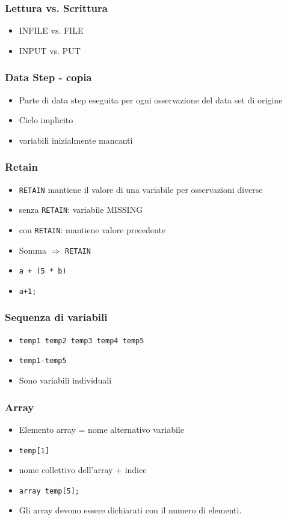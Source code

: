 \begin{frame}\frametitle{Lettura vs. Scrittura}
\begin{itemize}
\item
INFILE vs. FILE
\item
INPUT vs. PUT
\end{itemize}
\end{frame}



\begin{frame}[fragile]\frametitle{Data Step - copia }
  \begin{itemize}
  \item
    Parte di data step eseguita per ogni osservazione del data set di origine
  \item
    Ciclo implicito
  \item variabili inizialmente mancanti
  \end{itemize}
\end{frame}

\begin{frame}[fragile]\frametitle{Retain}
  \begin{itemize}
  \item
    \verb+RETAIN+ mantiene il valore di una variabile per osservazioni diverse
  \item
    senza \verb+RETAIN+: variabile MISSING
  \item
    con \verb+RETAIN+: mantiene valore precedente
  \item
    Somma $\Rightarrow$ \verb+RETAIN+
  \item
    \verb!a + (5 * b)!
  \item
    \verb!a+1;!
  \end{itemize}
\end{frame}




\begin{frame}[containsverbatim]\frametitle{Sequenza di variabili}
  \begin{itemize}
  \item
    \verb+temp1 temp2 temp3 temp4 temp5+
  \item
    \verb+temp1-temp5+
  \item
    Sono variabili individuali
  \end{itemize}\end{frame}


\begin{frame}[containsverbatim]\frametitle{Array}
  \begin{itemize}
  \item
    Elemento array = nome alternativo variabile
  \item
    \verb!temp[1]!
  \item
    nome collettivo dell'array + indice
  \item
    \verb!array temp[5];!
  \item
    Gli array devono essere \alert{dichiarati} con il numero di elementi.
  \end{itemize}\end{frame}


